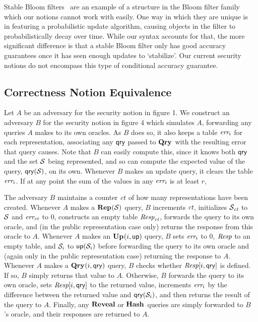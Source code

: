 Stable Bloom filters~\cite{xxx} are an example of a structure in the Bloom filter family which our notions cannot work with easily. One way in which they are unique is in featuring a probabilistic update algorithm, causing objects in the filter to probabilistically decay over time. While our syntax accounts for that, the more significant difference is that a stable Bloom filter only has good accuracy guarantees once it has seen enough updates to `stabilize'. Our current security notions do not encompass this type of conditional accuracy guarantee.

\subsection{Correctness Notion Equivalence}

Let $A$ be an adversary for the security notion in figure 1. We construct an adversary $B$ for the security notion in figure 4 which simulates $A$, forwarding any queries $A$ makes to its own oracles. As $B$ does so, it also keeps a table $\textit{err}_i$ for each representation, associating any $\mathsf{qry}$ passed to $\mathbf{Qry}\hspace{0.5pt}$ with the resulting error that query causes. Note that $B$ can easily compute this, since it knows both $\mathsf{qry}$ and the set $\mathcal{S}$ being represented, and so can compute the expected value of the query, $\mathsf{qry}(\mathcal{S})$, on its own. Whenever $B$ makes an update query, it clears the table $\textit{err}_i$. If at any point the sum of the values in any $\textit{err}_i$ is at least $r$, 

The adversary $B$ maintains a counter $\textit{ct}$ of how many representations have been created. Whenever $A$ makes a $\mathbf{Rep}\hspace{0.5pt}(\mathcal{S})$ query, $B$ increments $\textit{ct}$, initializes $\mathcal{S}_{\textit{ct}}$ to $\mathcal{S}$ and $\textit{err}_{\textit{ct}}$ to 0, constructs an empty table $\textit{Resp}_{\textit{ct}}$, forwards the query to its own oracle, and (in the public representation case only) returns the response from this oracle to $A$. Whenever $A$ makes an $\mathbf{Up}\hspace{0.5pt}(i,\mathsf{up})$ query, $B$ sets $\textit{err}_i$ to 0, $\textit{Resp}$ to an empty table, and $\mathcal{S}_i$ to $\mathsf{up}(\mathcal{S}_i)$ before forwarding the query to its own oracle and (again only in the public representation case) returning the response to $A$. Whenever $A$ makes a $\mathbf{Qry}\hspace{0.5pt}(i,\mathsf{qry})$ query, $B$ checks whether $\textit{Resp}[i,\mathsf{qry}]$ is defined. If so, $B$ simply returns that value to $A$. Otherwise, $B$ forwards the query to its own oracle, sets $\textit{Resp}[i,\mathsf{qry}]$ to the returned value, increments $\textit{err}_i$ by the difference between the returned value and $\mathsf{qry}(\mathcal{S}_i)$, and then returns the result of the query to $A$. Finally, any $\mathbf{Reveal}$ or $\mathbf{Hash}\hspace{0.5pt}$ queries are simply forwarded to $B$'s oracle, and their responses are returned to $A$.

